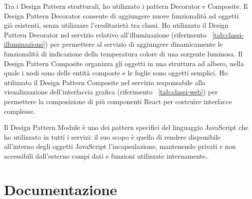 Tra i Design Pattern strutturali, ho utilizzato i pattern Decorator e Composite.
Il Design Pattern Decorator consente di aggiungere nuove funzionalità ad oggetti già esistenti, senza utilizzare l'ereditarietà tra classi.
Ho utilizzato il Design Pattern Decorator nel servizio relativo all'illuminazione (riferimento ~\ref{tab:classi-illuminazione}) per permettere al servizio di aggiungere dinamicamente le funzionalità di indicazione della temperatura colore di una sorgente luminosa.
Il Design Pattern Composite organizza gli oggetti in una struttura ad albero, nella quale i nodi sono delle entità composte e le foglie sono oggetti semplici.
Ho utilizzato il Design Pattern Composite nel servizio responsabile alla visualizzazione dell'interfaccia grafica (riferimento ~\ref{tab:classi-web}) per permettere la composizione di più componenti React per costruire interfacce complesse.

Il Design Pattern Module è uno dei pattern specifici del linguaggio JavaScript che ho utilizzato in tutti i servizi: il suo scopo è quello di rendere disponibile all’interno degli oggetti JavaScript l’incapsulazione, mantenendo privati e non accessibili dall’esterno campi dati e funzioni utilizzate internamente.

\section{Documentazione}

